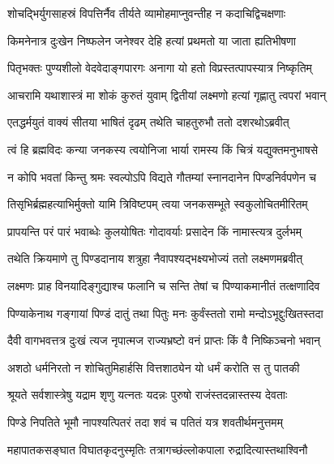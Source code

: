 \twolineshloka
{शोचद्भिर्युगसाहस्रं विपत्तिर्नैव तीर्यते}
{व्यामोहमाप्नुवन्तीह न कदाचिद्विचक्षणाः} %

\twolineshloka
{किमनेनात्र दुःखेन निष्फलेन जनेश्वर}
{देहि हत्यां प्रथमतो या जाता ह्यतिभीषणा} %

\twolineshloka
{पितृभक्तः पुण्यशीलो वेदवेदाङ्गपारगः}
{अनागा यो हतो विप्रस्तत्पापस्यात्र निष्कृतिम्} %

\twolineshloka
{आचरामि यथाशास्त्रं मा शोकं कुरुतं युवाम्}
{द्वितीयां लक्ष्मणो हत्यां गृह्णातु त्वपरां भवान्} %



\twolineshloka
{एतद्धर्मयुतं वाक्यं सीतया भाषितं दृढम्}
{तथेति चाहतुरुभौ ततो दशरथोऽब्रवीत्} %



\twolineshloka
{त्वं हि ब्रह्मविदः कन्या जनकस्य त्वयोनिजा}
{भार्या रामस्य किं चित्रं यद्युक्तमनुभाषसे} %

\twolineshloka
{न कोपि भवतां किन्तु श्रमः स्वल्पोऽपि विद्यते}
{गौतम्यां स्नानदानेन पिण्डनिर्वपणेन च} %

\twolineshloka
{तिसृभिर्ब्रह्महत्याभिर्मुक्तो यामि त्रिविष्टपम्}
{त्वया जनकसम्भूते स्वकुलोचितमीरितम्} %

\twolineshloka
{प्रापयन्ति परं पारं भवाब्धेः कुलयोषितः}
{गोदावर्याः प्रसादेन किं नामास्त्यत्र दुर्लभम्} %



\twolineshloka
{तथेति क्रियमाणे तु पिण्डदानाय शत्रुहा}
{नैवापश्यद्भक्ष्यभोज्यं ततो लक्ष्मणमब्रवीत्} %

\twolineshloka
{लक्ष्मणः प्राह विनयादिङ्गुद्याश्च फलानि च}
{सन्ति तेषां च पिण्याकमानीतं तत्क्षणादिव} %

\twolineshloka
{पिण्याकेनाथ गङ्गायां पिण्डं दातुं तथा पितुः}
{मनः कुर्वंस्ततो रामो मन्दोऽभूद्दुःखितस्तदा} %

\twolineshloka
{दैवी वागभवत्तत्र दुःखं त्यज नृपात्मज}
{राज्यभ्रष्टो वनं प्राप्तः किं वै निष्किञ्चनो भवान्} %

\twolineshloka
{अशठो धर्मनिरतो न शोचितुमिहार्हसि}
{वित्तशाठ्येन यो धर्मं करोति स तु पातकी} %

\twolineshloka
{श्रूयते सर्वशास्त्रेषु यद्राम शृणु यत्नतः}
{यदन्नः पुरुषो राजंस्तदन्नास्तस्य देवताः} %

\twolineshloka
{पिण्डे निपतिते भूमौ नापश्यत्पितरं तदा}
{शवं च पतितं यत्र शवतीर्थमनुत्तमम्} %

\twolineshloka
{महापातकसङ्घात विघातकृदनुस्मृतिः}
{तत्रागच्छंल्लोकपाला रुद्रादित्यास्तथाश्विनौ} %

